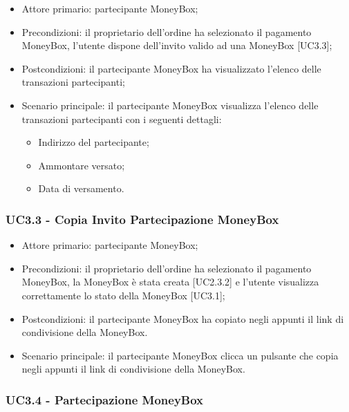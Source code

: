 \begin{itemize}
    \item Attore primario: partecipante MoneyBox\glo{};
    \item Precondizioni: il proprietario dell'ordine ha selezionato il pagamento MoneyBox\glo [UC2.2.2], 
            l'utente dispone dell'invito valido ad una MoneyBox\glo{} [UC3.3];
    \item Postcondizioni: il partecipante MoneyBox\glo{} ha visualizzato l'elenco delle transazioni partecipanti;
    \item Scenario principale: il partecipante MoneyBox\glo{} visualizza l'elenco delle transazioni partecipanti con i seguenti dettagli:
        \begin{itemize}
            \item Indirizzo del partecipante;
            \item Ammontare versato;
            \item Data di versamento.
        \end{itemize}
\end{itemize}

\subsubsection{UC3.3 - Copia Invito Partecipazione MoneyBox}

\begin{itemize}
    \item Attore primario: partecipante MoneyBox\glo{};
    \item Precondizioni: il proprietario dell'ordine ha selezionato il pagamento MoneyBox\glo [UC2.2.2], la MoneyBox\glo{} è stata creata [UC2.3.2] e l'utente visualizza correttamente lo stato della MoneyBox\glo{} [UC3.1];
    \item Postcondizioni: il partecipante MoneyBox\glo{} ha copiato negli appunti il link di condivisione della MoneyBox\glo{}.
    \item Scenario principale: il partecipante MoneyBox\glo{} clicca un pulsante che copia negli appunti il link di condivisione della MoneyBox\glo{}.
\end{itemize}

\subsubsection{UC3.4 - Partecipazione MoneyBox}

